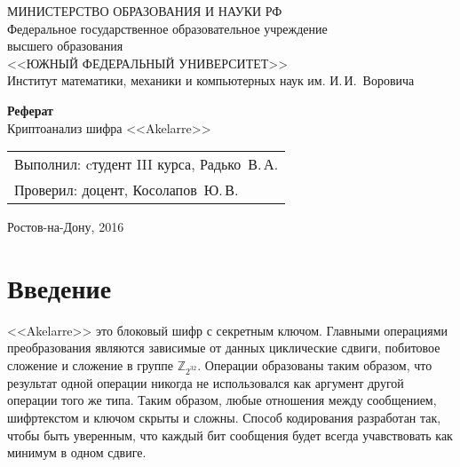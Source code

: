 \documentclass[12pt, a4paper]{article}
\begin{document}
\thispagestyle{empty}
\begin{centering}

МИНИСТЕРСТВО ОБРАЗОВАНИЯ И НАУКИ РФ\\
Федеральное государственное образовательное учреждение\\ высшего образования\\
<<ЮЖНЫЙ ФЕДЕРАЛЬНЫЙ УНИВЕРСИТЕТ>> \\
\vspace{1cm}
Институт математики, механики и компьютерных наук им. И.\,И.~Воровича\\
\vspace{6cm}

{\Large \textbf{Реферат} } \\
Криптоанализ шифра <<Akelarre>>\\
\end{centering}

\vfill

\begin{flushright}
\begin{tabular}{l}
Выполнил: cтудент III курса, {Радько~В.\,А.} \\
Проверил: доцент, {Косолапов~Ю.\,В.} \\
\end{tabular}
\end{flushright}

\vspace{4cm}

\begin{centering}
Ростов-на-Дону, 2016\\
\end{centering}

\newpage

\tableofcontents

\newpage

\section{Введение}

<<Akelarre>> это блоковый шифр с секретным ключом. Главными операциями преобразования являются зависимые от данных циклические сдвиги, побитовое сложение и сложение в группе $\mathds{Z}_{2^{32}}$. Операции образованы таким образом, что результат одной операции никогда не использовался как аргумент другой операции того же типа. Таким образом, любые отношения между сообщением, шифртекстом и ключом скрыты и сложны.
Способ кодирования разработан так, чтобы быть уверенным, что каждый бит сообщения будет всегда учавствовать как минимум в одном сдвиге.
\end{document}
